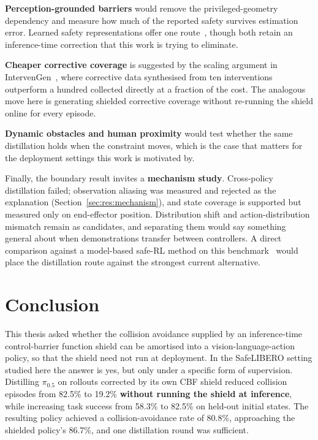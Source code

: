 \documentclass[a4paper,11pt]{report}
\begin{document}
\textbf{Perception-grounded barriers} would remove the privileged-geometry dependency and measure
how much of the reported safety survives estimation error. Learned safety representations offer one
route~\cite{meng2024conbat,sun2025lpb}, though both retain an inference-time correction that this
work is trying to eliminate.

\textbf{Cheaper corrective coverage} is suggested by the scaling argument in
IntervenGen~\cite{hoque2024intervengen}, where corrective data synthesised from ten interventions
outperform a hundred collected directly at a fraction of the cost. The analogous move here is
generating shielded corrective coverage without re-running the shield online for every episode.

\textbf{Dynamic obstacles and human proximity} would test whether the same distillation holds when
the constraint moves, which is the case that matters for the deployment settings this work is
motivated by.

Finally, the boundary result invites a \textbf{mechanism study}. Cross-policy distillation failed;
observation aliasing was measured and rejected as the explanation
(Section~\ref{sec:res:mechanism}), and state coverage is supported but measured only on
end-effector position. Distribution shift and action-distribution mismatch remain as candidates,
and separating them would say something general about when demonstrations transfer between
controllers. A direct comparison against a model-based safe-RL method on this
benchmark~\cite{safedojo} would place the distillation route against the strongest current
alternative.


\chapter{Conclusion}\label{ch:conclusion}
\label{sec:conc}

This thesis asked whether the collision avoidance supplied by an inference-time control-barrier
function shield can be amortised into a vision-language-action policy, so that the shield need not
run at deployment. In the SafeLIBERO setting studied here the answer is yes, but only under a
specific form of supervision. Distilling $\pi_{0.5}$ on rollouts corrected by its own CBF shield
reduced collision episodes from 82.5\% to 19.2\% \textbf{without running the shield at inference},
while increasing task success from 58.3\% to 82.5\% on held-out initial states. The resulting
policy achieved a collision-avoidance rate of 80.8\%, approaching the shielded policy's 86.7\%, and
one distillation round was sufficient.
\end{document}
